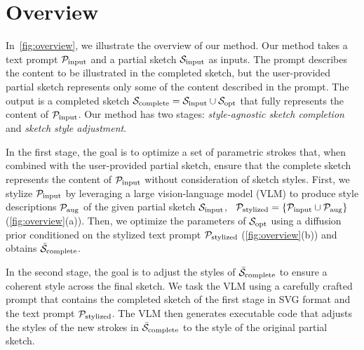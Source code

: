 




\section{Overview}
In~\cref{fig:overview}, we illustrate the overview of our method.
Our method takes a text prompt $\mathcal{P}_{\mathrm{input}}$ and a partial sketch $\mathcal{S}_{\mathrm{input}}$ as inputs.
The prompt describes the content to be illustrated in the completed sketch, but the user-provided partial sketch represents only some of the content described in the prompt.
The output is a completed sketch $\mathcal{S}_{\mathrm{complete}}=\mathcal{S}_{\mathrm{input}} \cup \mathcal{S}_{\mathrm{opt}}$ that fully represents the content of $\mathcal{P}_{\mathrm{input}}$.
Our method has two stages: \textit{style-agnostic sketch completion} and \textit{sketch style adjustment}.

In the first stage, the goal is to optimize a set of parametric strokes that, when combined with the user-provided partial sketch, ensure that the complete sketch represents the content of $\mathcal{P}_{\mathrm{input}}$ without consideration of sketch styles.
First, we stylize $\mathcal{P}_{\mathrm{input}}$ by leveraging a large vision-language model (VLM) to produce style descriptions $\mathcal{P}_{\mathrm{aug}}$ of the given partial sketch $\mathcal{S}_{\mathrm{input}}$, \ie~$\mathcal{P}_{\mathrm{stylized}}=\{\mathcal{P}_{\mathrm{input}} \cup \mathcal{P}_{\mathrm{aug}}\}$ (\cref{fig:overview}(a)).
Then, we optimize the parameters of $\mathcal{S}_{\mathrm{opt}}$ using a diffusion prior conditioned on the stylized text prompt $\mathcal{P}_{\mathrm{stylized}}$ (\cref{fig:overview}(b)) and obtains $\mathcal{\bar{S}}_{\mathrm{complete}}$.

In the second stage, the goal is to adjust the styles of $\mathcal{\bar{S}}_{\mathrm{complete}}$ to ensure a coherent style across the final sketch. 
We task the VLM using a carefully crafted prompt that contains the completed sketch of the first stage in SVG format and the text prompt $\mathcal{P}_{\mathrm{stylized}}$.
The VLM then generates executable code that adjusts the styles of the new strokes in $\mathcal{\bar{S}}_{\mathrm{complete}}$ to the style of the original partial sketch. 
